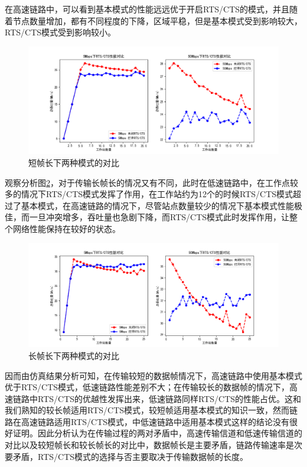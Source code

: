 \documentclass{article}
\begin{document}
在高速链路中，可以看到基本模式的性能远远优于开启RTS/CTS的模式，并且随着节点数量增加，都有不同程度的下降，区域平稳，但是基本模式受到影响较大，RTS/CTS模式受到影响较小。

\begin{figure}[ht]
	\centering
	\includegraphics[scale=0.6]{picture/RTS_CTS_shortpacketLen.png}
	\caption{短帧长下两种模式的对比}
	\label{fig:RTS_CTS_shortpacketLen}
\end{figure}

观察分析图\ref{fig:RTS_CTS_longpacketLen}，对于传输长帧长的情况又有不同，此时在低速链路中，在工作点较多的情况下RTS/CTS模式发挥了作用，在工作站约为12个的时候RTS/CTS模式超过了基本模式，在高速链路的情况下，尽管站点数量较少的情况下基本模式性能极佳，而一旦冲突增多，吞吐量也急剧下降，而RTS/CTS模式此时发挥作用，让整个网络性能保持在较好的状态。

\begin{figure}[ht]
	\centering
	\includegraphics[scale=0.6]{picture/RTS_CTS_longpacketLen.png}
	\caption{长帧长下两种模式的对比}
	\label{fig:RTS_CTS_longpacketLen}
\end{figure}

因而由仿真结果分析可知，在传输较短的数据帧情况下，高速链路中使用基本模式优于RTS/CTS模式，低速链路性能差别不大；在传输较长的数据帧的情况下，高速链路中RTS/CTS的优越性发挥出来，低速链路同样RTS/CTS的性能占优。这和我们熟知的较长帧适用RTS/CTS模式，较短帧适用基本模式的知识一致，然而链路在高速链路适用RTS/CTS模式，中低速链路中适用基本模式这样的结论\cite{1}没有很好证明。因此分析认为在传输过程的两对矛盾中，高速传输信道和低速传输信道的对比以及较短帧长和较长帧长的对比中，数据帧长是主要矛盾，链路传输速率是次要矛盾，RTS/CTS模式的选择与否主要取决于传输数据帧的长度。
\end{document}
